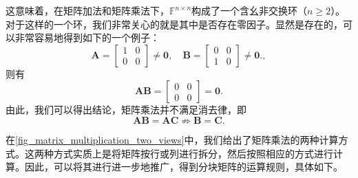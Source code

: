 这意味着，在矩阵加法和矩阵乘法下，\( \mathbb{F}^{n \times n} \)构成了一个含幺非交换环（\( n \geq 2 \)）。对于这样的一个环，我们非常关心的就是其中是否存在零因子。显然是存在的，可以非常容易地得到如下的一个例子：
\[
    \mathbf A=
    \begin{bmatrix}
        1 & 0 \\
        0 & 0
    \end{bmatrix} \neq \mathbf{0},
    \quad
    \mathbf B=
    \begin{bmatrix}
        0 & 0 \\
        1 & 0
    \end{bmatrix} \neq \mathbf{0}.,
\]
则有
\[
    \mathbf A\mathbf B=
    \begin{bmatrix}
        0 & 0 \\
        0 & 0
    \end{bmatrix}=\mathbf{0}.
\]
由此，我们可以得出结论，矩阵乘法并不满足消去律，即
\[
    \mathbf{A}\mathbf{B}=\mathbf{A}\mathbf{C} \not\Rightarrow \mathbf{B}=\mathbf{C}.
\]

在\cref{fig_matrix_multiplication_two_views}中，我们给出了矩阵乘法的两种计算方式。这两种方式实质上是将矩阵按行或列进行拆分，然后按照相应的方式进行计算。因此，可以将其进行进一步地推广，得到分块矩阵的运算规则，具体如下。

